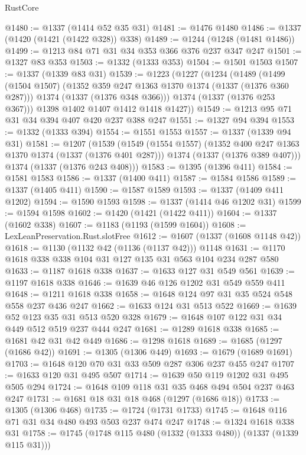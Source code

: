 \begin{lexlean}{RustCore}
\begin{coremodule}
@1480 := @1337 (@1414 @52 @35 @31)
@1481 := @1476 @1480
@1486 := @1337 (@1420 (@1421 (@1422 @328)) @338)
@1489 := @1244 (@1248 (@1481 @1486))
@1499 := @1213 @84 @71 @31 @34 @353 @366 @376 @237 @347 @247
@1501 := @1327 @83 @353
@1503 := @1332 (@1333 @353)
@1504 := @1501 @1503
@1507 := @1337 (@1339 @83 @31)
@1539 := @1223
    (@1227
      (@1234
        (@1489
          (@1499
            (@1504 @1507)
            (@1352 @359 @247 @1363 @1370 @1374 (@1337 (@1376 @360 @287)))
            @1374
            (@1337 (@1376 @348 @366)))
          @1374
          (@1337 (@1376 @253 @367)))
        @1398
        @1402
        @1407
        @1412
        @1418
        @1427))
@1549 := @1213 @95 @71 @31 @34 @394 @407 @420 @237 @388 @247
@1551 := @1327 @94 @394
@1553 := @1332 (@1333 @394)
@1554 := @1551 @1553
@1557 := @1337 (@1339 @94 @31)
@1581 := @1207
    (@1539
      (@1549
        (@1554 @1557)
        (@1352 @400 @247 @1363 @1370 @1374 (@1337 (@1376 @401 @287)))
        @1374
        (@1337 (@1376 @389 @407)))
      @1374
      (@1337 (@1376 @243 @408)))
@1583 := @1395 (@1396 @411)
@1584 := @1581 @1583
@1586 := @1337 (@1400 @411)
@1587 := @1584 @1586
@1589 := @1337 (@1405 @411)
@1590 := @1587 @1589
@1593 := @1337 (@1409 @411 @1202)
@1594 := @1590 @1593
@1598 := @1337 (@1414 @46 @1202 @31)
@1599 := @1594 @1598
@1602 := @1420 (@1421 (@1422 @411))
@1604 := @1337 (@1602 @338)
@1607 := @1183 (@1193 (@1599 @1604))
@1608 := LexLeanPreservation.Rust.slotFree
@1612 := @1607 (@1337 (@1608 @1148 @42))
@1618 := @1130 (@1132 @42 (@1136 (@1137 @42))) @1148
@1631 := @1170 @1618 @338 @338 @104 @31 @127 @135 @31 @563 @104 @234 @287 @580
@1633 := @1187 @1618 @338
@1637 := @1633 @127 @31 @549 @561
@1639 := @1197 @1618 @338
@1646 := @1639 @46 @126 @1202 @31 @549 @559 @411
@1648 := @1211 @1618 @338
@1658 := @1648 @124 @97 @31 @35 @524 @548 @558 @237 @436 @247
@1662 := @1633 @124 @31 @513 @522
@1669 := @1639 @52 @123 @35 @31 @513 @520 @328
@1679 := @1648 @107 @122 @31 @34 @449 @512 @519 @237 @444 @247
@1681 := @1289 @1618 @338
@1685 := @1681 @42 @31 @42 @449
@1686 := @1298 @1618
@1689 := @1685 (@1297 (@1686 @42))
@1691 := @1305 (@1306 @449)
@1693 := @1679 (@1689 @1691)
@1703 := @1648 @120 @70 @31 @33 @509 @287 @306 @237 @455 @247
@1707 := @1633 @120 @31 @495 @507
@1714 := @1639 @50 @119 @1202 @31 @495 @505 @294
@1724 := @1648 @109 @118 @31 @35 @468 @494 @504 @237 @463 @247
@1731 := @1681 @18 @31 @18 @468 (@1297 (@1686 @18))
@1733 := @1305 (@1306 @468)
@1735 := @1724 (@1731 @1733)
@1745 := @1648 @116 @71 @31 @34 @480 @493 @503 @237 @474 @247
@1748 := @1324 @1618 @338 @31
@1758 := @1745 (@1748 @115 @480 (@1332 (@1333 @480)) (@1337 (@1339 @115 @31)))

\end{coremodule}
\end{lexlean}
